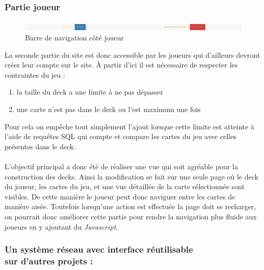 \documentclass[a4paper,11pt]{report}
\begin{document}
	\subsubsection{Partie joueur}
	\paragraph{}

	\begin{figure}[th]
      	 \begin{center}
          \includegraphics[scale=0.25]{Assets/navbar_joueur.png}
          \caption{Barre de navigation côté joueur}
          \label{RepTravail}
         \end{center}
        \end{figure}

      La seconde partie du site est donc accessible par les joueurs qui d'ailleurs devront créer leur compte sur le site. À partir d'ici il est nécessaire de respecter les contraintes du jeu : 

	\begin{enumerate}
		\item la taille du deck a une limite à ne pas dépasser
		\item une carte n'est pas dans le deck ou l'est maximum une fois
	\end{enumerate}Pour cela on empêche tout simplement l'ajout lorsque cette limite est atteinte à l'aide de requêtes SQL qui compte et compare les cartes du jeu avec celles présentes dans le deck.
	
	\paragraph{}
	L'objectif principal a donc été de réaliser une vue qui soit agréable pour la construction des decks. Ainsi la modification se fait sur une seule page où le deck du joueur, les cartes du jeu, et une vue détaillée de la carte sélectionnée sont visibles. De cette manière le joueur peut donc naviguer entre les cartes de manière aisée. Toutefois lorsqu'une action est effectuée la page doit se recharger, on pourrait donc améliorer cette partie pour rendre la navigation plus fluide aux joueurs en y ajoutant du \textit{Javascript}.




      \subsubsection{Un système réseau avec interface réutilisable\\ sur d'autres projets :}
\end{document}
